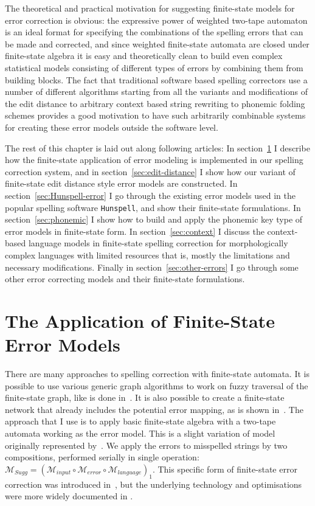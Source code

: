\documentclass[officiallayout,draft]{unihelcompling}
\begin{document}
The theoretical and practical motivation for suggesting finite-state models for
error correction is obvious: the expressive power of weighted two-tape
automaton is an ideal format for specifying the combinations of the spelling
errors that can be made and corrected, and since weighted finite-state automata
are closed under finite-state algebra it is easy and theoretically clean to
build even complex statistical models consisting of different types of errors
by combining them from building blocks. The fact that traditional software
based spelling correctors use a number of different algorithms starting from
all the variants and modifications of the edit distance to arbitrary context
based string rewriting to phonemic folding schemes provides a good motivation
to have such arbitrarily combinable systems for creating these error models
outside the software level.

The rest of this chapter is laid out along following articles: In
section~\ref{sec:error-application} I describe how the finite-state application
of error modeling is implemented in our spelling correction system, and in
section~\ref{sec:edit-distance} I show how our variant of finite-state edit
distance style error models are constructed.  In
section~\ref{sec:Hunspell-error} I go through the existing error models used in
the popular spelling software \texttt{Hunspell}, and show their finite-state
formulations. In section~\ref{sec:phonemic} I show how to build and apply
the phonemic key type of error models in finite-state form. 
In section~\ref{sec:context} I discuss the context-based language models in
finite-state spelling correction for morphologically complex languages with
limited resources that is, mostly the limitations and necessary modifications.
Finally in section~\ref{sec:other-errors} I go through some other error
correcting models and their finite-state formulations.

\section{The Application of Finite-State Error Models}
\label{sec:error-application}

There are many approaches to spelling correction with finite-state automata.
It is possible to use various generic graph algorithms to work on fuzzy
traversal of the finite-state graph, like is done in~\citet{hulden2009fast}.
It is also possible to create a finite-state network that already includes the
potential error mapping, as is shown in~\citet{schulz2002fast}. The approach
that I use is to apply basic finite-state algebra with a two-tape automata
working as the error model. This is a slight variation of model originally
represented by~\citet{mohri2003edit}. We apply the errors to
misspelled strings by two compositions, performed serially in single operation:
$\mathcal{M}_{Sugg} = (\mathcal{M}_{input} \circ \mathcal{M}_{error} \circ
\mathcal{M}_{language})_1$.  This specific form of finite-state error
correction was introduced in~, but the
underlying technology and optimisations were more widely documented in
\citet{linden2011hfst}.
\end{document}
